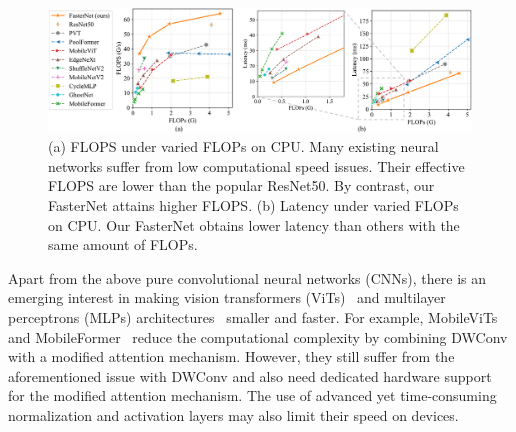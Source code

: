 \begin{figure}
    \centering
    \includegraphics[width=1\linewidth]{figures/FLOPS_latency_vs_FLOPs-cropped.pdf}
    \vspace{-0.3in}
    \caption{(a) FLOPS under varied FLOPs on CPU. Many existing neural networks suffer from low computational speed issues. Their effective FLOPS are lower than the popular ResNet50. By contrast, our FasterNet attains higher FLOPS. (b) Latency under varied FLOPs on CPU. Our FasterNet obtains lower latency than others with the same amount of FLOPs.}
    \label{fig:FLOPS(latency)_vs_FLOPs}
    \vspace{-0.05in}
\end{figure}

Apart from the above pure convolutional neural networks (CNNs),  there is an emerging interest in making vision transformers (ViTs)~\cite{dosovitskiy2020image} and multilayer perceptrons (MLPs) architectures~\cite{tolstikhin2021mlp} smaller and faster. For example, MobileViTs~\cite{mehta2021mobilevit,mehta2022separable,wadekar2022mobilevitv3} and MobileFormer~\cite{chen2022mobile} reduce the computational complexity by combining DWConv with a modified attention mechanism. However, they still suffer from the aforementioned issue with DWConv and also need dedicated hardware support for the modified attention mechanism. The use of advanced yet time-consuming normalization and activation layers may also limit their speed on devices.

